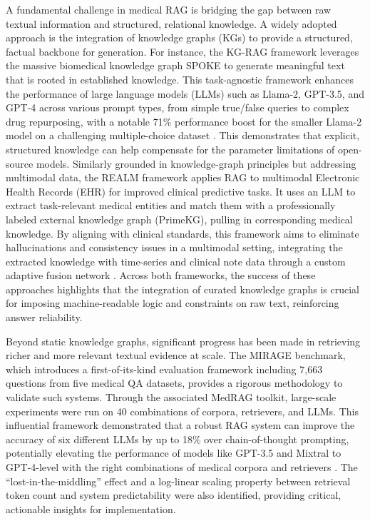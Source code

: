 \documentclass[11pt]{article}
\begin{document}
A fundamental challenge in medical RAG is bridging the gap between raw textual information and structured, relational knowledge. A widely adopted approach is the integration of knowledge graphs (KGs) to provide a structured, factual backbone for generation. For instance, the KG-RAG framework leverages the massive biomedical knowledge graph SPOKE to generate meaningful text that is rooted in established knowledge. This task-agnostic framework enhances the performance of large language models (LLMs) such as Llama-2, GPT-3.5, and GPT-4 across various prompt types, from simple true/false queries to complex drug repurposing, with a notable 71\% performance boost for the smaller Llama-2 model on a challenging multiple-choice dataset \cite{ref173}. This demonstrates that explicit, structured knowledge can help compensate for the parameter limitations of open-source models. Similarly grounded in knowledge-graph principles but addressing multimodal data, the REALM framework applies RAG to multimodal Electronic Health Records (EHR) for improved clinical predictive tasks. It uses an LLM to extract task-relevant medical entities and match them with a professionally labeled external knowledge graph (PrimeKG), pulling in corresponding medical knowledge. By aligning with clinical standards, this framework aims to eliminate hallucinations and consistency issues in a multimodal setting, integrating the extracted knowledge with time-series and clinical note data through a custom adaptive fusion network \cite{ref174}. Across both frameworks, the success of these approaches highlights that the integration of curated knowledge graphs is crucial for imposing machine-readable logic and constraints on raw text, reinforcing answer reliability.

Beyond static knowledge graphs, significant progress has been made in retrieving richer and more relevant textual evidence at scale. The MIRAGE benchmark, which introduces a first-of-its-kind evaluation framework including 7,663 questions from five medical QA datasets, provides a rigorous methodology to validate such systems. Through the associated MedRAG toolkit, large-scale experiments were run on 40 combinations of corpora, retrievers, and LLMs. This influential framework demonstrated that a robust RAG system can improve the accuracy of six different LLMs by up to 18\% over chain-of-thought prompting, potentially elevating the performance of models like GPT-3.5 and Mixtral to GPT-4-level with the right combinations of medical corpora and retrievers \cite{ref175}. The ``lost-in-the-middling'' effect and a log-linear scaling property between retrieval token count and system predictability were also identified, providing critical, actionable insights for implementation.
\end{document}
